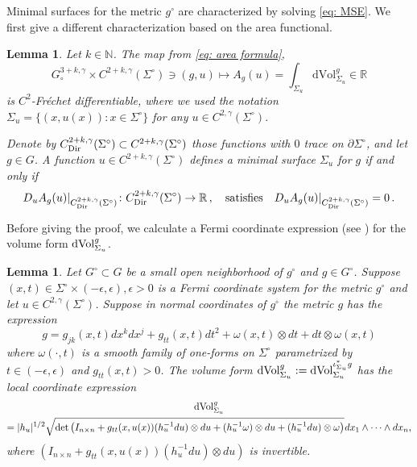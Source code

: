 \documentclass[11pt]{amsart}
\newtheorem{Lemma}[Theorem]{Lemma}
\theoremstyle{definition}
\numberwithin{equation}{section}
\newcommand{\mR}{\mathbb{R}}                    %
\newcommand{\dd}{\mathrm{d}}
\newcommand{\s}{\hspace{0.5pt}}
\begin{document}
Minimal surfaces for the metric $g^\circ$ are characterized by solving \eqref{eq: MSE}. We first give a different characterization based on the area functional.
\begin{Lemma}\label{lem:newdef}
Let $k\in\mathbb{N}$. The map from \eqref{eq: area formula}, 
\begin{equation}\label{eq:areaformula2}
   G^{3+k,\gamma}_\circ\times C^{2+k,\gamma}(\Sigma^\circ) \ni (g,u)\mapsto A_{g}(u) = \int_{\Sigma_u}\dd\mathrm{Vol}^{g}_{\Sigma_u} \in \mR    
\end{equation}
is $C^{2}$-Fr\'echet differentiable, where we used the notation $\Sigma_u=\{(x,u(x))\colon x\in\Sigma^\circ\}$ for any $u\in C^{2,\gamma}(\Sigma^\circ)$.

Denote by $C^{2+k,\gamma}_{\rm Dir}(\Sigma^\circ) \subset C^{2+k,\gamma}(\Sigma^\circ)$ those functions with $0$ trace on $\partial \Sigma^\circ$, and let $g \in G$. A function $u\in C^{2+k,\gamma}(\Sigma^\circ)$ defines a minimal surface $\Sigma_u$ for $g$ if and only if
\begin{equation}\label{eq:defofminsurf}
		D_u A_{g}(u)\vert_{C^{2+k,\gamma}_{\rm Dir}(\Sigma^\circ)} \colon C^{2+k,\gamma}_{\rm Dir}(\Sigma^\circ) \to \mR\,,\quad\text{satisfies}\quad D_u A_{g}(u)\vert_{C^{2+k,\gamma}_{\rm Dir}(\Sigma^\circ)} = 0\,.
\end{equation}
\end{Lemma}
Before giving the proof, we calculate a Fermi coordinate expression (see \cite[\S~5]{zbMATH06897812}) for the volume form ${\rm dVol}^{g}_{\Sigma_u}$. 
\begin{Lemma}\label{lem: volume form}
Let $G^\circ\subset G$ be a small open neighborhood of $g^\circ$ and $g \in G^\circ$. Suppose $(x,t)\in \Sigma^\circ\times (-\epsilon, \epsilon), \epsilon>0$ is a Fermi coordinate system for the metric $g^\circ$ and let $u\in C^{2,\gamma}(\Sigma^\circ)$. Suppose in normal coordinates of $g^\circ$ the metric $g$ has the expression
$$g = g_{jk}(x,t) dx^k dx^j + g_{tt}(x,t) dt^2 + \omega(x,t) \otimes dt  + dt\otimes \omega(x,t)$$
where $\omega(\cdot, t)$ is a smooth family of one-forms on $\Sigma^\circ$ parametrized by $t\in (-\epsilon,\epsilon)$ and $g_{tt}(x,t) >0$.
The volume form ${\rm dVol}^{g}_{\Sigma_u} :={\rm dVol}^{\iota_{\Sigma_u}^*g}_{\Sigma_u}$ has the local coordinate expression
\begin{multline}\label{eq: coordinate expression dvol}
{\rm dVol}^{g}_{\Sigma_u} \\ 
=|h_u|^{1/2}\sqrt{ {\rm det}\left(I_{n\times n} + g_{tt}(x,u(x))(h_u^{-1} du) \otimes du + (h_u^{-1} \omega) \otimes du+ (h_u^{-1} du) \otimes \omega\right)}\s 
dx_1\wedge\dots\wedge dx_n,
\end{multline}
where $(I_{n\times n} + g_{tt}(x,u(x))(h_u^{-1} du) \otimes du) $ is invertible.
\end{Lemma}
\end{document}
